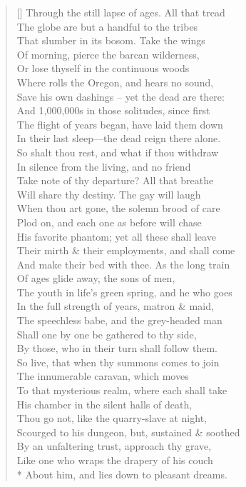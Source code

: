 \documentclass[MAIN]{subfiles}
\begin{document}
\begin{verse}[\versewidth]
Through the still lapse of ages. All that tread\\
The globe are but a handful to the tribes\\
That slumber in its bosom. Take the wings\\
Of morning, pierce the barcan wilderness,\\
Or lose thyself in the continuous woods\\
Where rolls the {\sc Oregon}, and hears no sound,\\
Save his own dashings -- yet the dead are there:\\
And 1,000,000s in those solitudes, since first\\
The flight of years began, have laid them down\\
In their last sleep—the dead reign there alone.\\
So shalt thou rest, and what if thou withdraw\\
In silence from the living, and no friend\\
Take note of thy departure? All that breathe\\
Will share thy destiny. The gay will laugh\\
When thou art gone, the solemn brood of care\\
Plod on, and each one as before will chase\\
His favorite phantom; yet all these shall leave\\
Their mirth \& their employments, and shall come\\
And make their bed with thee. As the long train\\
Of ages glide away, the sons of men,\\
The youth in life's green spring, and he who goes\\
In the full strength of years, matron \& maid,\\
The speechless babe, and the grey-headed man\\
Shall one by one be gathered to thy side,\\
By those, who in their turn shall follow them.\\
So live, that when thy summons comes to join\\
The innumerable caravan, which moves\\
To that mysterious realm, where each shall take\\
His chamber in the silent halls of death,\\
Thou go not, like the quarry-slave at night,\\
Scourged to his dungeon, but, sustained \& soothed\\
By an unfaltering trust, approach thy grave,\\
Like one who wraps the drapery of his couch\\*
About him, and lies down to pleasant dreams.
\end{verse}
\end{document}
